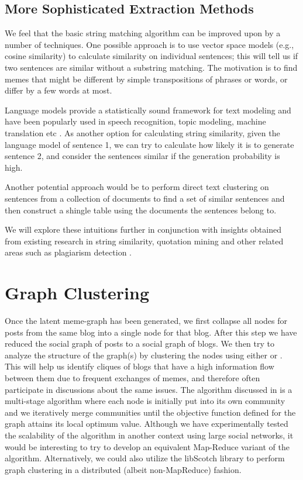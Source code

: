 \documentclass{acm_proc_article-sp}
\begin{document}
\subsection{More Sophisticated Extraction Methods}
We feel that the basic string matching algorithm can be improved upon by a number of techniques. One possible approach is to use vector space models (e.g., cosine similarity) to calculate similarity on individual sentences; this will tell us if two sentences are similar without a substring matching. The motivation is to find memes that might be different by simple transpositions of phrases or words, or differ by a few words at most.

Language models provide a statistically sound framework for text modeling and have been popularly used in speech recognition, topic modeling, machine translation etc \cite{ponte1998language}. As another option for calculating string similarity, given the language model of sentence 1, we can try to calculate how likely it is to generate sentence 2, and consider the sentences similar if the generation probability is high.

Another potential approach would be to perform direct text clustering on sentences from a collection of documents to find a set of similar sentences and then construct a shingle table using the documents the sentences belong to.

We will explore these intuitions further in conjunction with insights obtained from existing research in string similarity\cite{achananuparp2008evaluation}, quotation mining and other related areas such as plagiarism detection \cite{kim2009efficient}. 

\section{Graph Clustering}

Once the latent meme-graph has been generated, we first collapse all nodes for posts from the same blog into a single node for that blog. After this step we have reduced the social graph of posts to a social graph of blogs. We then try to analyze the structure of the graph(s) by clustering the nodes using either \cite{blondel2008fast} or \cite{tang2009clustering}. This will help us identify cliques of blogs that have a high information flow between them due to frequent exchanges of memes, and therefore often participate in discussions about the same issues. The algorithm discussed in \cite{blondel2008fast} is a multi-stage algorithm where each node is initially put into its own community and we iteratively merge communities until the objective function defined for the graph attains its local optimum value. Although we have experimentally tested the scalability of the algorithm in another context using large social networks, it would be interesting to try to develop an equivalent Map-Reduce variant of the algorithm. Alternatively, we could also utilize the libScotch library \cite{pellegrini2008scotch} to perform graph clustering in a distributed (albeit non-MapReduce) fashion.
\end{document}
